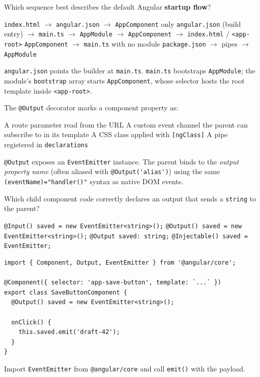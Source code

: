 \question[4]
Which sequence best describes the default Angular \textbf{startup flow}?
\begin{choices}
  \choice \texttt{index.html} $\rightarrow$ \texttt{angular.json} $\rightarrow$ \texttt{AppComponent} only
  \CorrectChoice \texttt{angular.json} (build entry) $\rightarrow$ \texttt{main.ts} $\rightarrow$ \texttt{AppModule} $\rightarrow$ \texttt{AppComponent} $\rightarrow$ \texttt{index.html} / \lstinline[style=htmlinline]|<app-root>|
  \choice \texttt{AppComponent} $\rightarrow$ \texttt{main.ts} with no module
  \choice \texttt{package.json} $\rightarrow$ pipes $\rightarrow$ \texttt{AppModule}
\end{choices}
\begin{solution}
  \texttt{angular.json} points the builder at \texttt{main.ts}. \texttt{main.ts} bootstraps \texttt{AppModule}; the module's \texttt{bootstrap} array starts \texttt{AppComponent}, whose selector hosts the root template inside \lstinline[style=htmlinline]|<app-root>|.
\end{solution}

\question[4]
The \lstinline[style=tsinline]|@Output| decorator marks a component property as:
\begin{choices}
  \choice A route parameter read from the URL
  \CorrectChoice A custom event channel the parent can subscribe to in its template
  \choice A CSS class applied with \lstinline[style=htmlinline]|[ngClass]|
  \choice A pipe registered in \texttt{declarations}
\end{choices}
\begin{solution}
  \lstinline[style=tsinline]|@Output| exposes an \lstinline[style=tsinline]|EventEmitter| instance. The parent binds to the \emph{output property name} (often aliased with \lstinline[style=tsinline]|@Output('alias')|) using the same \lstinline[style=htmlinline]|(eventName)="handler()"| syntax as native DOM events.
\end{solution}

\question[4]
Which child component code correctly declares an output that sends a \texttt{string} to the parent?
\begin{choices}
  \choice \lstinline[style=tsinline]|@Input() saved = new EventEmitter<string>();|
  \CorrectChoice \lstinline[style=tsinline]|@Output() saved = new EventEmitter<string>();|
  \choice \lstinline[style=tsinline]|@Output saved: string;|
  \choice \lstinline[style=tsinline]|@Injectable() saved = EventEmitter;|
\end{choices}
\begin{solution}
\begin{lstlisting}[style=ts]
import { Component, Output, EventEmitter } from '@angular/core';

@Component({ selector: 'app-save-button', template: `...` })
export class SaveButtonComponent {
  @Output() saved = new EventEmitter<string>();

  onClick() {
    this.saved.emit('draft-42');
  }
}
\end{lstlisting}
  Import \lstinline[style=tsinline]|EventEmitter| from \lstinline[style=tsinline]|@angular/core| and call \lstinline[style=tsinline]|emit()| with the payload.
\end{solution}

